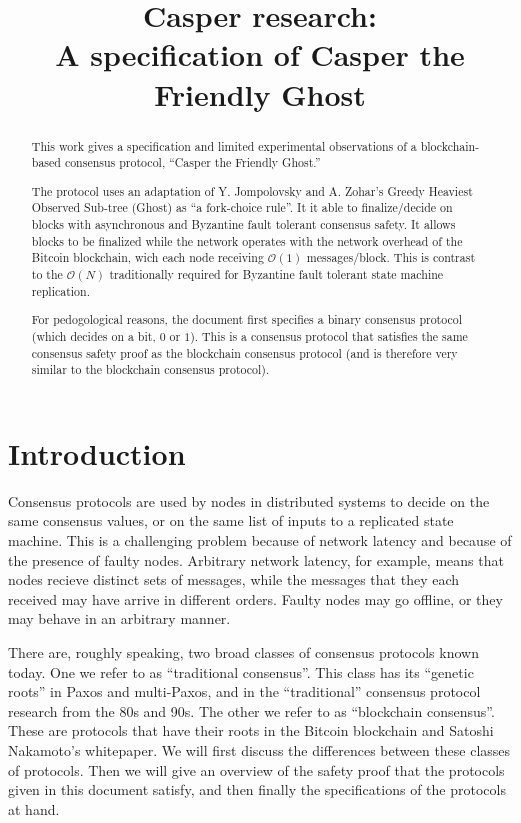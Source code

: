 \documentclass{article}
\theoremstyle{definition}
\begin{document}
\title{Casper research: \\ A specification of Casper the Friendly Ghost}
\maketitle

\begin{abstract}
This work gives a specification and limited experimental observations of a blockchain-based consensus protocol, ``Casper the Friendly Ghost.'' 

The protocol uses an adaptation of Y. Jompolovsky and A. Zohar's Greedy Heaviest Observed Sub-tree (Ghost) as ``a fork-choice rule''. It it able to finalize/decide on blocks with asynchronous and Byzantine fault tolerant consensus safety. It allows blocks to be finalized while the network operates with the network overhead of the Bitcoin blockchain, wich each node receiving $\mathcal{O}(1)$ messages/block. This is contrast to the $\mathcal{O}(N)$ traditionally required for Byzantine fault tolerant state machine replication.

For pedogological reasons, the document first specifies a binary consensus protocol (which decides on a bit, $0$ or $1$). This is a consensus protocol that satisfies the same consensus safety proof as the blockchain consensus protocol (and is therefore very similar to the blockchain consensus protocol). 
\end{abstract}

\section{Introduction}

Consensus protocols are used by nodes in distributed systems to decide on the same consensus values, or on the same list of inputs to a replicated state machine. This is a challenging problem because of network latency and because of the presence of faulty nodes. Arbitrary network latency, for example, means that nodes recieve distinct sets of messages, while the messages that they each received may have arrive in different orders. Faulty nodes may go offline, or they may behave in an arbitrary manner. 

There are, roughly speaking, two broad classes of consensus protocols known today. One we refer to as ``traditional consensus''. This class has its ``genetic roots'' in Paxos and multi-Paxos, and in the ``traditional'' consensus protocol research from the 80s and 90s\cite{lamport_1998}. The other we refer to as ``blockchain consensus''. These are protocols that have their roots in the Bitcoin blockchain and Satoshi Nakamoto's whitepaper\cite{nakamoto}. We will first discuss the differences between these classes of protocols. Then we will give an overview of the safety proof that the protocols given in this document satisfy, and then finally the specifications of the protocols at hand.
\end{document}

